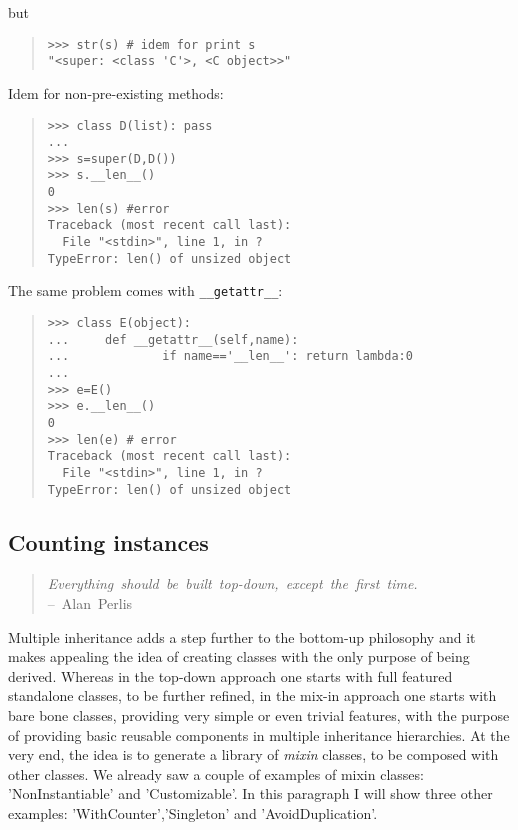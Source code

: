 \documentclass[10pt,english]{article}
\begin{document}
but
\begin{quote}
\begin{verbatim}>>> str(s) # idem for print s
"<super: <class 'C'>, <C object>>"\end{verbatim}
\end{quote}

Idem for non-pre-existing methods:
\begin{quote}
\begin{verbatim}>>> class D(list): pass
...
>>> s=super(D,D())
>>> s.__len__()
0
>>> len(s) #error
Traceback (most recent call last):
  File "<stdin>", line 1, in ?
TypeError: len() of unsized object\end{verbatim}
\end{quote}

The same problem comes with \texttt{{\_}{\_}getattr{\_}{\_}}:
\begin{quote}
\begin{verbatim}>>> class E(object):
...     def __getattr__(self,name):
...             if name=='__len__': return lambda:0
...
>>> e=E()
>>> e.__len__()
0
>>> len(e) # error
Traceback (most recent call last):
  File "<stdin>", line 1, in ?
TypeError: len() of unsized object\end{verbatim}
\end{quote}



\hypertarget{counting-instances}{}
\subsection*{Counting instances}
\begin{quote}
\begin{flushleft}
\emph{Everything~should~be~built~top-down,~except~the~first~time.}~\\
--~Alan~Perlis
\end{flushleft}
\end{quote}

Multiple inheritance adds a step further to the bottom-up philosophy and
it makes appealing the idea of creating classes with the only 
purpose of being derived. Whereas in the top-down approach one starts
with full featured standalone classes, to be further refined, in the
mix-in approach one starts with bare bone classes, providing very simple 
or even trivial features, with the purpose of providing 
basic reusable components in multiple inheritance hierarchies.
At the very end, the idea is to generate a library of \emph{mixin} classes, to be
composed with other classes. We already saw a couple of examples of
mixin classes: 'NonInstantiable' and 'Customizable'. In this paragraph
I will show three other examples: 'WithCounter','Singleton' and
'AvoidDuplication'.
\end{document}
